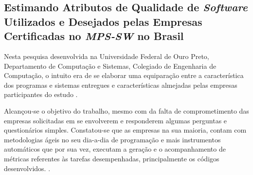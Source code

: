 \subsection{Estimando Atributos de Qualidade de \textit{Software}
Utilizados e Desejados pelas Empresas
Certificadas no \textit{MPS-SW} no Brasil \cite{EstimandoAtributos}}

Nesta pesquisa desenvolvida na Universidade Federal de Ouro Preto, Departamento de Computação e Sistemas, Colegiado de Engenharia de Computação, o intuito era de se elaborar uma equiparação entre a característica dos programas e sistemas entregues e características almejadas pelas empresas participantes do estudo \cite{EstimandoAtributos}.

Alcançou-se o objetivo do trabalho, mesmo com da falta de comprometimento das empresas solicitadas em se envolverem e responderem algumas perguntas e questionários simples. Constatou-se que as empresas na sua maioria, contam com metodologias ágeis no seu dia-a-dia de programação e mais instrumentos automáticos que por sua vez, executam a geração e o acompanhamento de métricas referentes às tarefas desempenhadas, principalmente os códigos desenvolvidos. \cite{EstimandoAtributos}.
